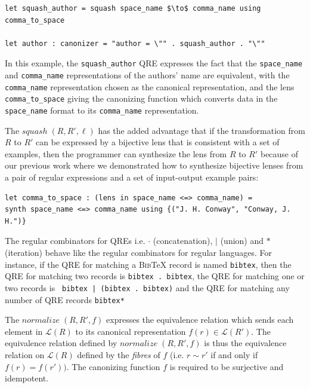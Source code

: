 \documentclass{svproc}
\newcommand{\cd}[1]{\lstinline[backgroundcolor=\color{white}]$#1$}
\newcommand{\squash}[3]{\ensuremath{\mathit{squash} \; (#1, #2, #3)}}
\newcommand{\normalize}[3]{\ensuremath{\mathit{normalize} \; (#1, #2, #3)}}
\newcommand{\bibtex}{\textsc{Bib}\TeX{}}
\begin{document}
\begin{lstlisting}
let squash_author = squash space_name $\to$ comma_name using comma_to_space

let author : canonizer = "author = \"" . squash_author . "\""
\end{lstlisting}

In this example, the \cd{squash_author} QRE expresses the fact that the
\cd{space_name} and \cd{comma_name} representations of the authors' name
are equivalent, with the \cd{comma_name} representation chosen as the
canonical representation, and the lens \cd{comma_to_space} giving
the canonizing function which converts data in the \cd{space_name} format
to its \cd{comma_name} representation.

The $\squash{R}{R'}{\ell}$ has the added advantage that if the transformation
from $R$ to $R'$ can be expressed by a bijective lens that is consistent with a set
of examples, then the programmer can synthesize the lens from $R$ to $R'$
because of our previous work where we demonstrated how to synthesize bijective
lenses from a pair of regular expressions and a set of input-output example
pairs:

\begin{lstlisting}
let comma_to_space : (lens in space_name <=> comma_name) = 
synth space_name <=> comma_name using {("J. H. Conway", "Conway, J. H.")}
\end{lstlisting}

The regular combinators for QREs i.e. $\cdot$ (concatenation), $|$ (union) and
$*$ (iteration) behave like the regular combinators for regular languages. For
instance, if the QRE for matching a \bibtex{} record is named
\cd{bibtex}, then the QRE for matching two records is 
\cd{bibtex . bibtex}, the QRE for matching one or two records is
\cd{ bibtex | (bibtex . bibtex)} and the QRE for matching any number of QRE
records \cd{bibtex*}

The $\normalize{R}{R'}{f}$ expresses the equivalence relation which sends each
element in $\mathcal{L}(R)$ to its canonical representation $f(r) \in
\mathcal{L}(R')$. The equivalence relation defined by
$\normalize{R}{R'}{f}$ is thus the equivalence relation on
$\mathcal{L}(R)$ defined by the {\em fibres} of $f$ (i.e. $r \sim r'$ if and
only if $f(r) = f(r'))$. The canonizing function $f$ is required to be
surjective and idempotent.
\end{document}
